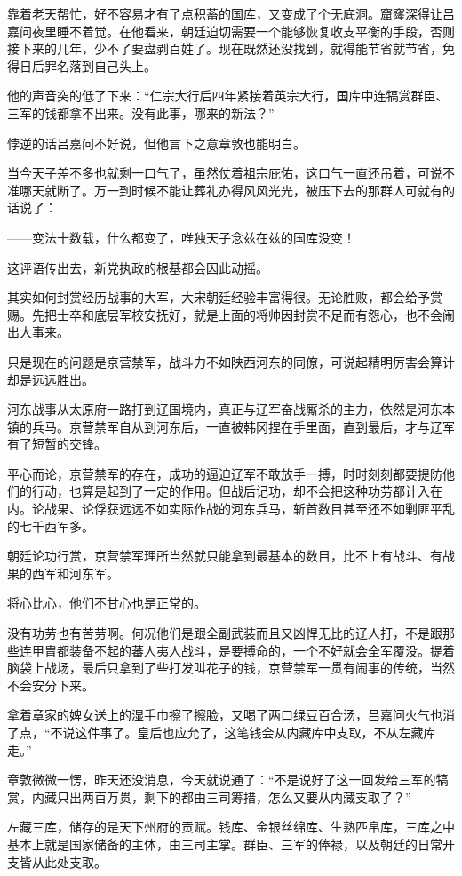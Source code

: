靠着老天帮忙，好不容易才有了点积蓄的国库，又变成了个无底洞。窟窿深得让吕嘉问夜里睡不着觉。在他看来，朝廷迫切需要一个能够恢复收支平衡的手段，否则接下来的几年，少不了要盘剥百姓了。现在既然还没找到，就得能节省就节省，免得日后罪名落到自己头上。

他的声音突的低了下来：“仁宗大行后四年紧接着英宗大行，国库中连犒赏群臣、三军的钱都拿不出来。没有此事，哪来的新法？”

悖逆的话吕嘉问不好说，但他言下之意章敦也能明白。

当今天子差不多也就剩一口气了，虽然仗着祖宗庇佑，这口气一直还吊着，可说不准哪天就断了。万一到时候不能让葬礼办得风风光光，被压下去的那群人可就有的话说了：

——变法十数载，什么都变了，唯独天子念兹在兹的国库没变！

这评语传出去，新党执政的根基都会因此动摇。

其实如何封赏经历战事的大军，大宋朝廷经验丰富得很。无论胜败，都会给予赏赐。先把士卒和底层军校安抚好，就是上面的将帅因封赏不足而有怨心，也不会闹出大事来。

只是现在的问题是京营禁军，战斗力不如陕西河东的同僚，可说起精明厉害会算计却是远远胜出。

河东战事从太原府一路打到辽国境内，真正与辽军奋战厮杀的主力，依然是河东本镇的兵马。京营禁军自从到河东后，一直被韩冈捏在手里面，直到最后，才与辽军有了短暂的交锋。

平心而论，京营禁军的存在，成功的逼迫辽军不敢放手一搏，时时刻刻都要提防他们的行动，也算是起到了一定的作用。但战后记功，却不会把这种功劳都计入在内。论战果、论俘获远远不如实际作战的河东兵马，斩首数目甚至还不如剿匪平乱的七千西军多。

朝廷论功行赏，京营禁军理所当然就只能拿到最基本的数目，比不上有战斗、有战果的西军和河东军。

将心比心，他们不甘心也是正常的。

没有功劳也有苦劳啊。何况他们是跟全副武装而且又凶悍无比的辽人打，不是跟那些连甲胄都装备不起的蕃人夷人战斗，是要搏命的，一个不好就会全军覆没。提着脑袋上战场，最后只拿到了些打发叫花子的钱，京营禁军一贯有闹事的传统，当然不会安分下来。

拿着章家的婢女送上的湿手巾擦了擦脸，又喝了两口绿豆百合汤，吕嘉问火气也消了点，“不说这件事了。皇后也应允了，这笔钱会从内藏库中支取，不从左藏库走。”

章敦微微一愣，昨天还没消息，今天就说通了：“不是说好了这一回发给三军的犒赏，内藏只出两百万贯，剩下的都由三司筹措，怎么又要从内藏支取了？”

左藏三库，储存的是天下州府的贡赋。钱库、金银丝绵库、生熟匹帛库，三库之中基本上就是国家储备的主体，由三司主掌。群臣、三军的俸禄，以及朝廷的日常开支皆从此处支取。

